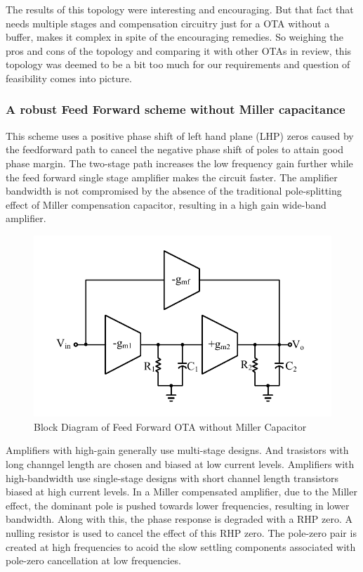 The results of this topology were interesting and encouraging. But that fact that needs multiple stages and compensation circuitry just for a OTA without a buffer, makes it complex in spite of the encouraging remedies. So weighing the pros and cons of the topology and comparing it with other OTAs in review, this topology was deemed to be a bit too much for our requirements and question of feasibility comes into picture.

\subsubsection{A robust Feed Forward scheme without Miller capacitance}

This scheme uses a positive phase shift of left hand plane (LHP) zeros caused by the feedforward path to cancel the negative phase shift of poles to attain good phase margin. The two-stage path increases the low frequency gain further  while the feed forward single stage amplifier makes the circuit faster. The amplifier bandwidth is not compromised by the absence of the traditional pole-splitting effect of Miller compensation capacitor, resulting in a high gain wide-band amplifier.

\begin{figure} [H]
\centering
\includegraphics[scale=1]{Figures/Misc/PDFs/FFNMCO.pdf}
\caption{Block Diagram of Feed Forward OTA without Miller Capacitor}
\label{fig:FFMNCO}
\end{figure}

Amplifiers with high-gain generally use multi-stage designs. And trasistors with long channgel length are chosen and biased at low current levels. Amplifiers with high-bandwidth use single-stage designs with short channel length transistors biased at high current levels. In a Miller compensated amplifier, due to the Miller effect, the dominant pole is pushed towards lower frequencies, resulting in lower bandwidth. Along with this, the phase response is degraded with a RHP zero. A nulling resistor is used to cancel the effect of this RHP zero. The pole-zero pair is created at high frequencies to acoid the slow settling components associated with pole-zero cancellation at low frequencies. 

